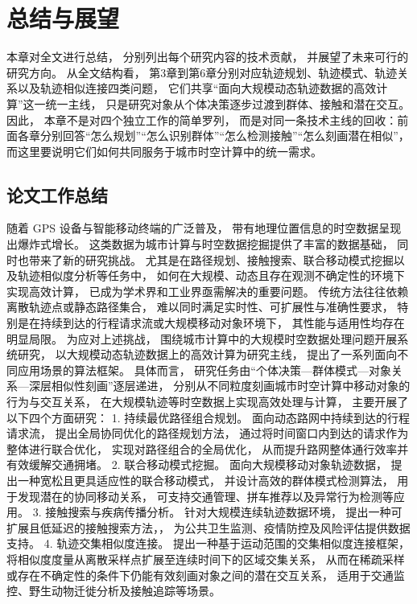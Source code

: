 \chapter{总结与展望}

本章对全文进行总结， 分别列出每个研究内容的技术贡献， 并展望了未来可行的研究方向。
从全文结构看， 第3章到第6章分别对应轨迹规划、轨迹模式、轨迹关系以及轨迹相似连接四类问题， 它们共享“面向大规模动态轨迹数据的高效计算”这一统一主线， 只是研究对象从个体决策逐步过渡到群体、接触和潜在交互。
因此， 本章不是对四个独立工作的简单罗列， 而是对同一条技术主线的回收：前面各章分别回答“怎么规划”“怎么识别群体”“怎么检测接触”“怎么刻画潜在相似”， 而这里要说明它们如何共同服务于城市时空计算中的统一需求。
\section{论文工作总结}
随着 GPS 设备与智能移动终端的广泛普及， 带有地理位置信息的时空数据呈现出爆炸式增长。 这类数据为城市计算与时空数据挖掘提供了丰富的数据基础， 同时也带来了新的研究挑战。 尤其是在路径规划、接触搜索、联合移动模式挖掘以及轨迹相似度分析等任务中， 如何在大规模、动态且存在观测不确定性的环境下实现高效计算， 已成为学术界和工业界亟需解决的重要问题。 传统方法往往依赖离散轨迹点或静态路径集合， 难以同时满足实时性、可扩展性与准确性要求， 特别是在持续到达的行程请求流或大规模移动对象环境下， 其性能与适用性均存在明显局限。 为应对上述挑战， 围绕城市计算中的大规模时空数据处理问题开展系统研究， 以大规模动态轨迹数据上的高效计算为研究主线， 提出了一系列面向不同应用场景的算法框架。 具体而言， 研究任务由“个体决策—群体模式—对象关系—深层相似性刻画”逐层递进， 分别从不同粒度刻画城市时空计算中移动对象的行为与交互关系， 在大规模轨迹等时空数据上实现高效处理与计算， 主要开展了以下四个方面研究：
	1.	持续最优路径组合规划。 面向动态路网中持续到达的行程请求流， 提出全局协同优化的路径规划方法， 通过将时间窗口内到达的请求作为整体进行联合优化， 实现对路径组合的全局优化， 从而提升路网整体通行效率并有效缓解交通拥堵。
	2.	联合移动模式挖掘。 面向大规模移动对象轨迹数据， 提出一种宽松且更具适应性的联合移动模式， 并设计高效的群体模式检测算法， 用于发现潜在的协同移动关系， 可支持交通管理、拼车推荐以及异常行为检测等应用。
	3.	接触搜索与疾病传播分析。 针对大规模连续轨迹数据环境， 提出一种可扩展且低延迟的接触搜索方法，， 为公共卫生监测、疫情防控及风险评估提供数据支持。
	4.	轨迹交集相似度连接。 提出一种基于运动范围的交集相似度连接框架， 将相似度度量从离散采样点扩展至连续时间下的区域交集关系， 从而在稀疏采样或存在不确定性的条件下仍能有效刻画对象之间的潜在交互关系， 适用于交通监控、野生动物迁徙分析及接触追踪等场景。

